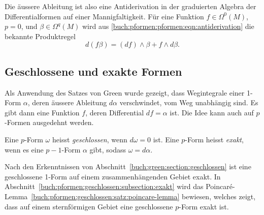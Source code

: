 Die äussere Ableitung ist also eine Antiderivation in der graduierten
Algebra der Differentialformen auf einer Mannigfaltigkeit.
Für eine Funktion $f\in\Omega^0(M)$, $p=0$, und $\beta\in\Omega^q(M)$ 
wird aus
\eqref{buch:pformen:pformen:eqn:antiderivation}
die bekannte Produktregel
\[
d(f\beta)
=
(df)\wedge \beta
+
f\wedge d\beta.
\]

%
%
\subsection{Geschlossene und exakte Formen}
Als Anwendung des Satzes von Green wurde gezeigt, dass Wegintegrale
einer 1-Form $\alpha$, deren äussere Ableitung $d\alpha$ verschwindet,
vom Weg unabhängig sind.
Es gibt dann eine Funktion $f$, deren Differential $df=\alpha$ ist.
Die Idee kann auch auf $p$-Formen ausgedehnt werden.

\begin{definition}
Eine $p$-Form $\omega$ heisst {\em geschlossen}, wenn $d\omega=0$ ist.
%
Eine $p$-Form heisst {\em exakt}, wenn es eine $p-1$-Form $\alpha$ gibt,
sodass $\omega = d\alpha$.
%
\end{definition}

Nach den Erkenntnissen von Abschnitt~\ref{buch:green:section:geschlossen}
ist eine geschlossene 1-Form auf einem zusammenhängenden Gebiet exakt.
In Abschnitt~\ref{buch:pformen:geschlossen:subsection:exakt}
wird das Poincaré-Lemma~\ref{buch:pformen:geschlossen:satz:poincare-lemma}
bewiesen, welches zeigt, dass auf einem sternförmigen Gebiet eine
geschlossene $p$-Form exakt ist.


